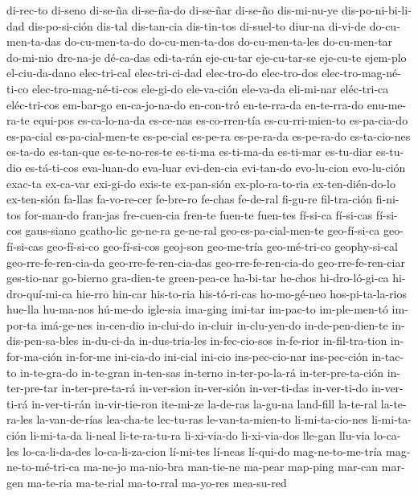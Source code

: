 {di-rec-to
di-seno
di-se-ña
di-se-ña-do
di-se-ñar
di-se-ño
dis-mi-nu-ye
dis-po-ni-bi-li-dad
dis-po-si-ción
dis-tal
dis-tan-cia
dis-tin-tos
di-suel-to
diur-na
di-vi-de
do-cu-men-ta-das
do-cu-men-ta-do
do-cu-men-ta-dos
do-cu-men-ta-les
do-cu-men-tar
do-mi-nio
dre-na-je
dé-ca-das
edi-ta-rán
eje-cu-tar
eje-cu-tar-se
eje-cu-te
ejem-plo
el-ciu-da-dano
elec-tri-cal
elec-tri-ci-dad
elec-tro-do
elec-tro-dos
elec-tro-mag-né-ti-co
elec-tro-mag-né-ti-cos
ele-gi-do
ele-va-ción
ele-va-da
eli-mi-nar
eléc-tri-ca
eléc-tri-cos
em-bar-go
en-ca-jo-na-do
en-con-tró
en-te-rra-da
en-te-rra-do
enu-me-ra-te
equi-pos
es-ca-lo-na-da
es-ce-nas
es-co-rren-tía
es-cu-rri-mien-to
es-pa-cia-do
es-pa-cial
es-pa-cial-men-te
es-pe-cial
es-pe-ra
es-pe-ra-da
es-pe-ra-do
es-ta-cio-nes
es-ta-do
es-tan-que
es-te-no-res-te
es-ti-ma
es-ti-ma-da
es-ti-mar
es-tu-diar
es-tu-dio
es-tá-ti-cos
eva-luan-do
eva-luar
evi-den-cia
evi-tan-do
evo-lu-cion
evo-lu-ción
exac-ta
ex-ca-var
exi-gi-do
exis-te
ex-pan-sión
ex-plo-ra-to-ria
ex-ten-dién-do-lo
ex-ten-sión
fa-llas
fa-vo-re-cer
fe-bre-ro
fe-chas
fe-de-ral
fi-gu-re
fil-tra-ción
fi-ni-tos
for-man-do
fran-jas
fre-cuen-cia
fren-te
fuen-te
fuen-tes
fí-si-ca
fí-si-cas
fí-si-cos
gaus-siano
gcatho-lic
ge-ne-ra
ge-ne-ral
geo-es-pa-cial-men-te
geo-fí-si-ca
geo-fí-si-cas
geo-fí-si-co
geo-fí-si-cos
geoj-son
geo-me-tría
geo-mé-tri-co
geophy-si-cal
geo-rre-fe-ren-cia-da
geo-rre-fe-ren-cia-das
geo-rre-fe-ren-cia-do
geo-rre-fe-ren-ciar
ges-tio-nar
go-bierno
gra-dien-te
green-pea-ce
ha-bi-tar
he-chos
hi-dro-ló-gi-ca
hi-dro-quí-mi-ca
hie-rro
hin-car
his-to-ria
his-tó-ri-cas
ho-mo-gé-neo
hos-pi-ta-la-rios
hue-lla
hu-ma-nos
hú-me-do
igle-sia
ima-ging
imi-tar
im-pac-to
im-ple-men-tó
im-por-ta
imá-ge-nes
in-cen-dio
in-clui-do
in-cluir
in-clu-yen-do
in-de-pen-dien-te
in-dis-pen-sa-bles
in-du-ci-da
in-dus-tria-les
in-fec-cio-sos
in-fe-rior
in-fil-tra-tion
in-for-ma-ción
in-for-me
ini-cia-do
ini-cial
ini-cio
ins-pec-cio-nar
ins-pec-ción
in-tac-to
in-te-gra-do
in-te-gran
in-ten-sas
in-terno
in-ter-po-la-rá
in-ter-pre-ta-ción
in-ter-pre-tar
in-ter-pre-ta-rá
in-ver-sion
in-ver-sión
in-ver-ti-das
in-ver-ti-do
in-ver-ti-rá
in-ver-ti-rán
in-vir-tie-ron
ite-mi-ze
la-de-ras
la-gu-na
land-fill
la-te-ral
la-te-ra-les
la-van-de-rías
lea-cha-te
lec-tu-ras
le-van-ta-mien-to
li-mi-ta-cio-nes
li-mi-ta-ción
li-mi-ta-da
li-neal
li-te-ra-tu-ra
li-xi-via-do
li-xi-via-dos
lle-gan
llu-via
lo-ca-les
lo-ca-li-da-des
lo-ca-li-za-cion
lí-mi-tes
lí-neas
lí-qui-do
mag-ne-to-me-tría
mag-ne-to-mé-tri-ca
ma-ne-jo
ma-nio-bra
man-tie-ne
ma-pear
map-ping
mar-can
mar-gen
ma-te-ria
ma-te-rial
ma-to-rral
ma-yo-res
mea-su-red
}
